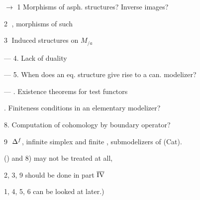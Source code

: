 
$\longrightarrow$ 1 Morphisms of asph. structures? Inverse images?

\textcircled{2} , morphisms of such

\textcircled{3} Induced structures on $M_{/a}$

--- 4. Lack of duality

--- 5. When does an eq. structure  give rise to a can. modelizer?

--- . Existence theorems for test functors

. Finiteness conditions in an elementary modelizer?

8. Computation of cohomology by boundary operator?

\textcircled{9} $\Delta^{{f}}$, infinite simplex and finite , submodelizers of (Cat).


() and 8) may not be treated at all,

2, 3, 9 should be done in part $\overline{\text{{IV}}}$

1, 4, 5, 6 can be looked at later.)
